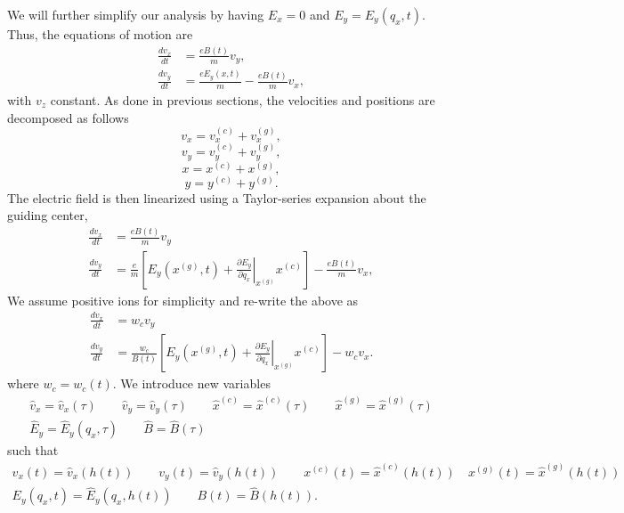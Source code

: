 \documentclass[a4paper,11pt]{report}
\begin{document}
We will further simplify our analysis by having $E_x = 0$ and $E_y = E_y(q_x,t)$. Thus, the equations of motion are
\begin{align}
    \frac{dv_x}{dt} &= \frac{eB(t)}{m} v_y, \\
    \frac{dv_y}{dt} &= \frac{eE_y(x,t)}{m} - \frac{eB(t)}{m}v_x,
\end{align}
with $v_z$ constant. As done in previous sections, the velocities and positions are decomposed as follows
\begin{equation}
    v_x = v_x^{(c)} + v_x^{(g)},
\end{equation}
\begin{equation}
    v_y = v_y^{(c)} + v_y^{(g)},
\end{equation}
\begin{equation}
    x = x^{(c)} + x^{(g)},
\end{equation}
\begin{equation}
    y = y^{(c)} + y^{(g)}.
\end{equation}
The electric field is then linearized using a Taylor-series expansion about the guiding center,
\begin{align}
    \frac{dv_x}{dt} &= \frac{eB(t)}{m} v_y \\
    \frac{dv_y}{dt} &= \frac{e}{m} \left [ E_y \left ( x^{(g)},t \right ) + \left .\frac{\partial E_y}{\partial q_x} \right |_{x^{(g)}} x^{(c)} \right ] - \frac{eB(t)}{m}v_x,
\end{align}
We assume positive ions for simplicity and re-write the above as
\begin{align}
    \frac{dv_x}{dt} &= w_c v_y \\
    \frac{dv_y}{dt} &= \frac{w_c}{B(t)} \left [ E_y \left ( x^{(g)},t \right ) + \left .\frac{\partial E_y}{\partial q_x} \right |_{x^{(g)}} x^{(c)} \right ] - w_c v_x.
\end{align}
where $w_c = w_c(t)$. We introduce new variables 
\begin{gather}
    \hat{v}_x = \hat{v}_x(\tau) \qquad \hat{v}_y = \hat{v}_y(\tau) \qquad \hat{x}^{(c)} = \hat{x}^{(c)}(\tau) \qquad \hat{x}^{(g)} = \hat{x}^{(g)}(\tau) \nonumber \\ \hat{E}_y = \hat{E}_y(q_x,\tau) \qquad \hat{B} = \hat{B}(\tau)
\end{gather}
such that 
\begin{gather}
    v_x(t) = \hat{v}_x(h(t)) \qquad
    v_y(t) = \hat{v}_y(h(t)) \qquad
    x^{(c)}(t) = \hat{x}^{(c)}(h(t)) \quad
    x^{(g)}(t) = \hat{x}^{(g)}(h(t)) \nonumber \\
    E_y(q_x,t) = \hat{E}_y(q_x,h(t)) \qquad
    B(t) = \hat{B}(h(t)).
\end{gather}
\end{document}
